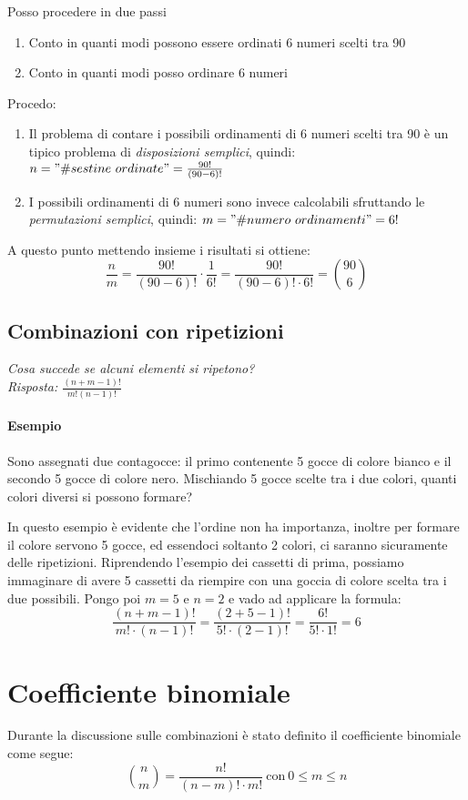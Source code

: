 \documentclass[12pt, a4paper]{report}
\theoremstyle{definition}
\begin{document}
Posso procedere in due passi
\begin{enumerate}
	\item Conto in quanti modi possono essere ordinati 6 numeri scelti tra 90
	\item Conto in quanti modi posso ordinare 6 numeri
\end{enumerate}
\noindent
Procedo:
\begin{enumerate}
	\item Il problema di contare i possibili ordinamenti di 6 numeri scelti tra
	90 è un tipico problema di \emph{disposizioni semplici}, quindi:
	\(n="\#sestine\ ordinate"=\frac{90!}{(90-6)!}\)
	\item I possibili ordinamenti di 6 numeri sono invece calcolabili sfruttando
	le \emph{permutazioni semplici}, quindi: \(m="\#numero\ ordinamenti"=6!\)
\end{enumerate}
\noindent
A questo punto mettendo insieme i risultati si ottiene:
\[\frac{n}{m} = \frac{90!}{(90-6)!}\cdot \frac{1}{6!} = \frac{90!}{(90-6)!\cdot 6!}
= \binom{90}{6}\]

\subsection{Combinazioni con ripetizioni}
\textit{Cosa succede se alcuni elementi si ripetono?}
\\\textit{Risposta: $\frac{(n+m-1)!}{m!(n-1)!}$}

\paragraph*{Esempio}
Sono assegnati due contagocce: il primo contenente 5 gocce di colore bianco e il
secondo 5 gocce di colore nero. Mischiando 5 gocce scelte tra i due colori,
quanti colori diversi si possono formare?

In questo esempio è evidente che l'ordine non ha importanza, inoltre per formare
il colore servono 5 gocce, ed essendoci soltanto 2 colori, ci saranno sicuramente
delle ripetizioni. Riprendendo l'esempio dei cassetti di prima, possiamo
immaginare di avere 5 cassetti da riempire con una goccia di colore scelta tra i
due possibili. Pongo poi $m=5$ e $n=2$ e vado ad applicare la formula:
\[\frac{(n+m-1)!}{m!\cdot (n-1)!} = \frac{(2+5-1)!}{5!\cdot (2-1)!} = \frac{6!}{5!\cdot 1!} = 6\]

\section{Coefficiente binomiale}
Durante la discussione sulle combinazioni è stato definito il coefficiente
binomiale come segue:
\[\binom{n}{m} = \frac{n!}{(n-m)!\cdot m!}\ \text{con}\ 0\leq m\leq n\]
\end{document}
